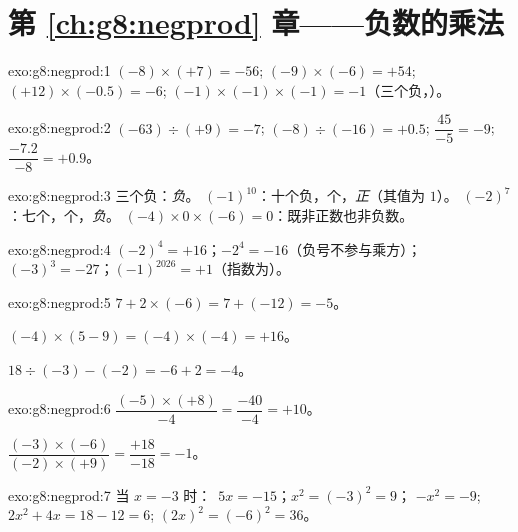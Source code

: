 \section*{第 \ref{ch:g8:negprod} 章——负数的乘法}

\begin{solution}{exo:g8:negprod:1}
$(-8) \times (+7) = -56$; \quad
$(-9) \times (-6) = +54$; \quad
$(+12) \times (-0.5) = -6$; \quad
$(-1) \times (-1) \times (-1) = -1$（三个负，）。
\end{solution}

\begin{solution}{exo:g8:negprod:2}
$(-63) \div (+9) = -7$; \quad
$(-8) \div (-16) = +0.5$; \quad
$\dfrac{45}{-5} = -9$; \quad
$\dfrac{-7.2}{-8} = +0.9$。
\end{solution}

\begin{solution}{exo:g8:negprod:3}
三个负：\emph{负}。\quad
$(-1)^{10}$：十个负，个，\emph{正}（其值为
$1$）。\quad
$(-2)^7$：七个，个，\emph{负}。\quad
$(-4) \times 0 \times (-6) = 0$：既非正数也非负数。
\end{solution}

\begin{solution}{exo:g8:negprod:4}
$(-2)^4 = +16$；\quad $-2^4 = -16$（负号不参与乘方）；\quad
$(-3)^3 = -27$；\quad $(-1)^{2026} = +1$（指数为）。
\end{solution}

\begin{solution}{exo:g8:negprod:5}
$7 + 2 \times (-6) = 7 + (-12) = -5$。

$(-4) \times (5 - 9) = (-4) \times (-4) = +16$。

$18 \div (-3) - (-2) = -6 + 2 = -4$。
\end{solution}

\begin{solution}{exo:g8:negprod:6}
$\dfrac{(-5) \times (+8)}{-4} = \dfrac{-40}{-4} = +10$。

$\dfrac{(-3) \times (-6)}{(-2) \times (+9)} = \dfrac{+18}{-18} = -1$。
\end{solution}

\begin{solution}{exo:g8:negprod:7}
当 $x = -3$ 时：\ $5x = -15$；\quad $x^2 = (-3)^2 = 9$；\quad
$-x^2 = -9$; \quad $2x^2 + 4x = 18 - 12 = 6$; \quad
$(2x)^2 = (-6)^2 = 36$。
\end{solution}


